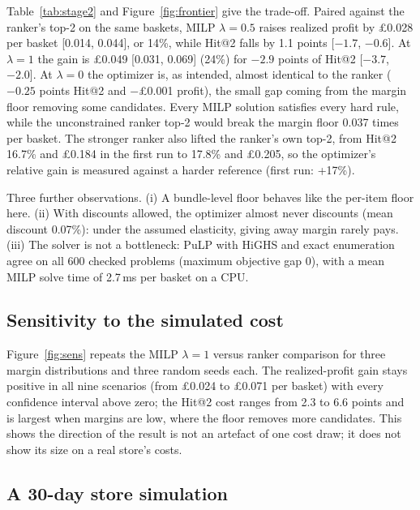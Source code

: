 \documentclass[11pt]{article}
\begin{document}
Table~\ref{tab:stage2} and Figure~\ref{fig:frontier} give the trade-off.
Paired against the ranker's top-2 on the same baskets, MILP $\lambda{=}0.5$ raises realized profit by \pounds0.028 per basket [0.014, 0.044], or 14\%, while Hit@2 falls by 1.1 points [$-1.7$, $-0.6$].
At $\lambda{=}1$ the gain is \pounds0.049 [0.031, 0.069] (24\%) for $-2.9$ points of Hit@2 [$-3.7$, $-2.0$].
At $\lambda{=}0$ the optimizer is, as intended, almost identical to the ranker ($-0.25$ points Hit@2 and $-$\pounds0.001 profit), the small gap coming from the margin floor removing some candidates.
Every MILP solution satisfies every hard rule, while the unconstrained ranker top-2 would break the margin floor 0.037 times per basket.
The stronger ranker also lifted the ranker's own top-2, from Hit@2 16.7\% and \pounds0.184 in the first run to 17.8\% and \pounds0.205, so the optimizer's relative gain is measured against a harder reference (first run: +17\%).

Three further observations.
(i) A bundle-level floor behaves like the per-item floor here.
(ii) With discounts allowed, the optimizer almost never discounts (mean discount 0.07\%): under the assumed elasticity, giving away margin rarely pays.
(iii) The solver is not a bottleneck: PuLP with HiGHS and exact enumeration agree on all 600 checked problems (maximum objective gap 0), with a mean MILP solve time of 2.7\,ms per basket on a CPU.

\subsection{Sensitivity to the simulated cost}\label{sec:sens}
Figure~\ref{fig:sens} repeats the MILP $\lambda{=}1$ versus ranker comparison for three margin distributions and three random seeds each.
The realized-profit gain stays positive in all nine scenarios (from \pounds0.024 to \pounds0.071 per basket) with every confidence interval above zero; the Hit@2 cost ranges from 2.3 to 6.6 points and is largest when margins are low, where the floor removes more candidates.
This shows the direction of the result is not an artefact of one cost draw; it does not show its size on a real store's costs.

\subsection{A 30-day store simulation}\label{sec:sim}
\end{document}
